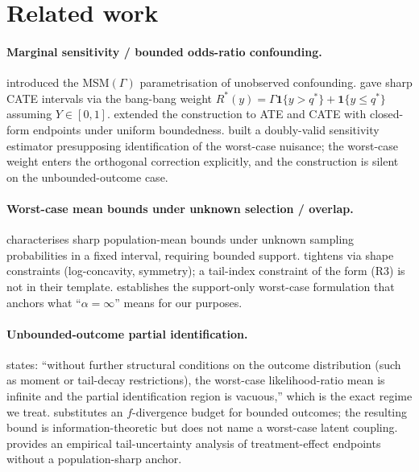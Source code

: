 \documentclass[11pt]{article}
\theoremstyle{definition}
\theoremstyle{plain}
\theoremstyle{remark}
\begin{document}
\begin{enumerate}[label=(\arabic*)]
\end{enumerate}

\section{Related work}

\paragraph{Marginal sensitivity / bounded odds-ratio confounding.} \citet{Tan2006} introduced the MSM$(\Gamma)$ parametrisation of unobserved confounding. \citet[Thm.~3.1, eq.~(7)]{KallusMaoZhou2019} gave sharp CATE intervals via the bang-bang weight $R^*(y) = \Gamma \mathbf{1}\{y > q^*\} + \mathbf{1}\{y \le q^*\}$ assuming $Y \in [0,1]$. \citet[Thm.~1, Cor.~3]{YadlowskyNamkoongBasuDuchiTian2022} extended the construction to ATE and CATE with closed-form endpoints under uniform boundedness. \citet[Thm.~1]{DornGuoKallus2025} built a doubly-valid sensitivity estimator presupposing identification of the worst-case nuisance; the worst-case weight enters the orthogonal correction explicitly, and the construction is silent on the unbounded-outcome case.

\paragraph{Worst-case mean bounds under unknown selection / overlap.} \citet[Thm.~1]{AronowLee2013} characterises sharp population-mean bounds under unknown sampling probabilities in a fixed interval, requiring bounded support. \citet[Thm.~1]{MiratrixWagerZubizarreta2018} tightens \citet{AronowLee2013} via shape constraints (log-concavity, symmetry); a tail-index constraint of the form (R3) is not in their template. \citet{Manski1990} establishes the support-only worst-case formulation that anchors what ``$\alpha = \infty$'' means for our purposes.

\paragraph{Unbounded-outcome partial identification.} \citet[Sec.~3.1, p.~5]{AsiaeePalBeckHuling2026} states: ``without further structural conditions on the outcome distribution (such as moment or tail-decay restrictions), the worst-case likelihood-ratio mean is infinite and the partial identification region is vacuous,'' which is the exact regime we treat. \citet[Thm.~4.2]{JungKang2026} substitutes an $f$-divergence budget for bounded outcomes; the resulting bound is information-theoretic but does not name a worst-case latent coupling. \citet{LordanSalehzadehNobari2026} provides an empirical tail-uncertainty analysis of treatment-effect endpoints without a population-sharp anchor.
\end{document}
